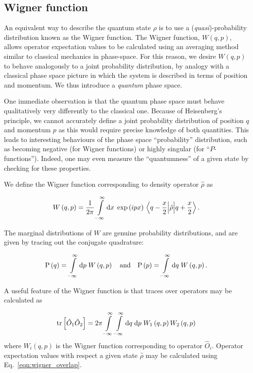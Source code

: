 \FloatBarrier
\subsection{Wigner function}
An equivalent way to describe the quantum state $\rho$ is to use a (\emph{quasi})-probability distribution known as the Wigner function. The Wigner function, $W\left(q, p\right)$, allows operator expectation values to be calculated using an averaging method similar to classical mechanics in phase-space. For this reason, we desire $W\left(q, p\right)$ to behave analogously to a joint probability distribution, by analogy with a classical phase space picture in which the system is described in terms of position and momentum. We thus introduce a \emph{quantum} phase space. 

One immediate observation is that the quantum phase space must behave qualitatively very differently to the classical one. Because of Heisenberg's principle, we cannot accurately define a joint probability distribution of position $q$ and momentum $p$ as this would require precise knowledge of both quantities. This leads to interesting behaviours of the phase space ``probability'' distribution, such as becoming negative (for Wigner functions) or highly singular (for ``$P$-functions''). Indeed, one may even measure the ``quantumness'' of a given state by checking for these properties.

We define the Wigner function corresponding to density operator $\hat{\rho}$ as \cite{Leonhardt2010}

\begin{equation}\label{eqn:intro_wigners_formula}
W\left(q, p\right) = \frac{1}{2 \pi} \int\limits_{-\infty}^{\infty} \mathrm{d}x \; \exp\left(i p x\right) \mel{q - \frac{x}{2}}{\hat{\rho}}{q + \frac{x}{2}}.
\end{equation}

\noindent The marginal distributions of $W$ are genuine probability distributions, and are given by tracing out the conjugate quadrature:

\begin{equation}
\text{P}\left(q\right) = \int\limits_{-\infty}^\infty \mathrm{d}p \; W\left(q, p\right) \qq{and} \text{P}\left(p\right) = \int\limits_{-\infty}^\infty \mathrm{d}q \; W\left(q, p\right).
\end{equation}

\noindent A useful feature of the Wigner function is that traces over operators may be calculated as

\begin{equation}\label{eqn:wigner_overlap}
\tr\left[\hat{O}_1 \hat{O}_2\right] = 2\pi \int\limits_{-\infty}^\infty \int\limits_{-\infty}^{\infty} \mathrm{d}q \; \mathrm{d}p \; W_1\left(q, p\right) W_2\left(q, p\right)
\end{equation}
where $W_i\left(q, p\right)$ is the Wigner function corresponding to operator $\hat{O}_i$. Operator expectation values with respect a given state $\hat{\rho}$ may be calculated using Eq.~\ref{eqn:wigner_overlap}. 

